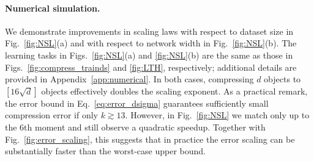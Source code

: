\documentclass{article}
\theoremstyle{plain}
\begin{document}




\vspace{-2mm}
\paragraph{Numerical simulation.}  
We demonstrate improvements in scaling laws with respect to dataset size in Fig.~\ref{fig:NSL}(a) and with respect to network width in Fig.~\ref{fig:NSL}(b). The learning tasks in Figs.~\ref{fig:NSL}(a) and \ref{fig:NSL}(b) are the same as those in Figs.~\ref{fig:compress_trainds} and \ref{fig:LTH}, respectively; additional details are provided in Appendix~\ref{app:numerical}. In both cases, compressing $d$ objects to $[16\sqrt{d}]$ objects effectively doubles the scaling exponent. As a practical remark, the error bound in Eq.~\eqref{eq:error_dsigma} guarantees sufficiently small compression error if only $k \gtrsim 13$. However, in Fig.~\ref{fig:NSL} we match only up to the $6$th moment and still observe a quadratic speedup. Together with Fig.~\ref{fig:error_scaling}, this suggests that in practice the error scaling can be substantially faster than the worst-case upper bound.%
\end{document}
